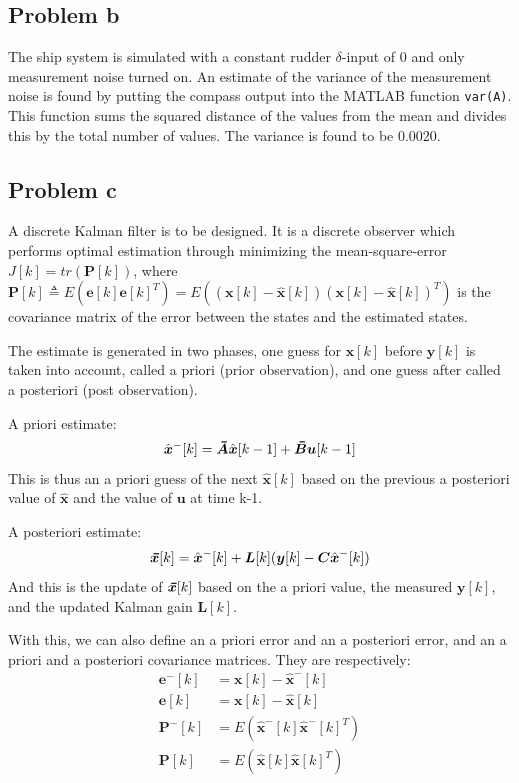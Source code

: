 \subsection{Problem b}
The ship system is simulated with a constant rudder $\delta$-input of 0 and only measurement noise turned on. An
estimate of the variance of 
the measurement noise is found by putting the compass output into the MATLAB function {\texttt{var(A)}}. This function
sums the squared distance of the values from the mean and divides this by the total number of values. The variance 
is found to be 0.0020.

\subsection{Problem c}
A discrete Kalman filter is to be designed. It is a discrete observer which performs optimal estimation through
minimizing the mean-square-error $J[k] = tr(\bm{P}[k])$, where
$\bm{P}[k] \triangleq E(\bm{e}[k]\bm{e}[k]^T) = E((\bm{x}[k] - \hat{\bm{x}}[k])(\bm{x}[k] - \hat{\bm{x}}[k])^T)$ is the
covariance matrix of the error between the states and the estimated states.

The estimate is generated in two phases, one guess for $\bm{x}[k]$ before $\bm{y}[k]$ is taken into account, called a
priori (prior observation), and one guess after called a posteriori (post observation).

A priori estimate:
\begin{equation}
\hat{\bm{x}}^-[k] = \thickbar{\bm{A}}\hat{\bm{x}}[k-1]+\thickbar{\bm{B}}\bm{u}[k-1] \label{a_priori_x}
\end{equation}
This is thus an a priori guess of the next $\hat{\bm{x}}[k]$ based on the previous a posteriori value of $\hat{\bm{x}}$ and the value of $\bm{u}$ at time k-1.

A posteriori estimate:
\begin{equation}
\thickbar{\bm{x}}[k] = \hat{\bm{x}}^-[k] + \bm{L}[k](\bm{y}[k] - \bm{C}\hat{\bm{x}}^-[k]) \label{a_posteriori_estimate}
\end{equation}
And this is the update of $\thickbar{\bm{x}}[k]$ based on the a priori value, the measured $\bm{y}[k]$, and the updated Kalman gain $\bm{L}[k]$.

With this, we can also define an a priori error and an a posteriori error, and an a priori and a posteriori covariance matrices. They are respectively:
\begin{align}
\bm{e}^-[k] &= \bm{x}[k] - \hat{\bm{x}}^-[k] \\
\bm{e}[k] &= \bm{x}[k] - \hat{\bm{x}}[k] \\
\bm{P}^-[k] &= E(\hat{\bm{x}}^-[k]\hat{\bm{x}}^-[k]^T) \\
\bm{P}[k] &= E(\hat{\bm{x}}[k]\hat{\bm{x}}[k]^T)
\end{align}

